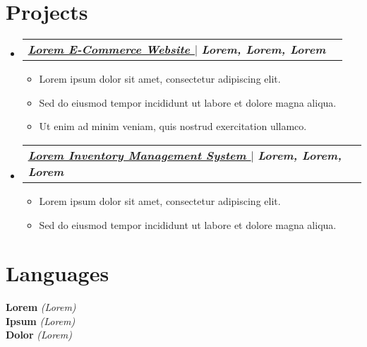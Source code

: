 \documentclass[letterpaper,11pt]{article}
\makeatletter
\newcommand{\resumeItem}[1]{
  \item\small{
    {#1 \vspace{-2pt}}
  }
}
\newcommand{\resumeProjectHeading}[2]{
    \item
    \begin{tabular*}{1.001\textwidth}{l@{\extracolsep{\fill}}r}
      \small#1 & \textbf{\small #2}\\
    \end{tabular*}\vspace{-7pt}
}
\newcommand{\resumeSubHeadingListStart}{\begin{itemize}[leftmargin=0.0in, label={}]}
\newcommand{\resumeSubHeadingListEnd}{\end{itemize}}
\newcommand{\resumeItemListStart}{\begin{itemize}}
\newcommand{\resumeItemListEnd}{\end{itemize}\vspace{-5pt}}
\makeatother
\begin{document}
\section{Projects}
\resumeSubHeadingListStart

\resumeProjectHeading
    {\href{https://google.com}{\color{black} \raisebox{0\height}{} \textbf{\textit{\ul{Lorem E-Commerce Website \faLink}}} } $|$ \emph{\textbf{Lorem, Lorem, Lorem}}}{}
    \resumeItemListStart
        \resumeItem{Lorem ipsum dolor sit amet, consectetur adipiscing elit.}
        \resumeItem{Sed do eiusmod tempor incididunt ut labore et dolore magna aliqua.}
        \resumeItem{Ut enim ad minim veniam, quis nostrud exercitation ullamco.}
    \resumeItemListEnd 

\vspace{-15pt}

\resumeProjectHeading
    {\href{https://google.com}{\color{black} \raisebox{0\height}{}\textbf{\textit{\ul{Lorem Inventory Management System \faLink}}}} $|$ \emph{\textbf{Lorem, Lorem, Lorem}}}{}
    \resumeItemListStart
        \resumeItem{Lorem ipsum dolor sit amet, consectetur adipiscing elit.}
        \resumeItem{Sed do eiusmod tempor incididunt ut labore et dolore magna aliqua.}
    \resumeItemListEnd 

\resumeSubHeadingListEnd
\vspace{-10pt}


\section{Languages}
\begin{itemize}[leftmargin=0.15in, label={}]
    \small{\item{
        \textbf{Lorem} \textit{(Lorem)} \\
        \textbf{Ipsum} \textit{(Lorem)} \\
        \textbf{Dolor} \textit{(Lorem)}
    }}
\end{itemize}
\vspace{-15pt}
\end{document}
